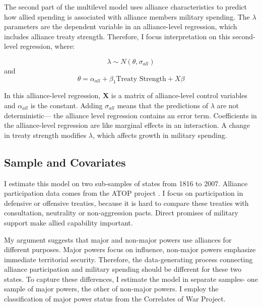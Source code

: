 \documentclass[12pt]{article}
\begin{document}
The second part of the multilevel model uses alliance characteristics to predict how allied spending is associated with alliance members military spending. 
The $\lambda$ parameters are the dependent variable in an alliance-level regression, which includes alliance treaty strength.
Therefore, I focus interpretation on this second-level regression, where: 

\begin{equation}
\lambda \sim N(\theta, \sigma_{all})
\end{equation} 
and 
\begin{equation}
\theta = \alpha_{all} + \beta_1 \mbox{Treaty Strength} + X \beta
\end{equation}

In this alliance-level regression, $\textbf{X}$ is a matrix of alliance-level control variables and $\alpha_{all}$ is the constant.
Adding $\sigma_{all}$ means that the predictions of $\lambda$ are not deterministic--- the alliance level regression contains an error term. 
Coefficients in the alliance-level regression are like marginal effects in an interaction. 
A change in treaty strength modifies $\lambda$, which affects growth in military spending. 


\subsection{Sample and Covariates} 

I estimate this model on two sub-samples of states from 1816 to 2007. 
Alliance participation data comes from the ATOP project \citep{Leedsetal2002}. 
I focus on participation in defensive or offensive treaties, because it is hard to compare these treaties with consultation, neutrality or non-aggression pacts. 
Direct promises of military support make allied capability important. 

My argument suggests that major and non-major powers use alliances for different purposes.
Major powers focus on influence, non-major powers emphasize immediate territorial security.  
Therefore, the data-generating process connecting alliance participation and military spending should be different for these two states. 
To capture these differences, I estimate the model in separate samples- one sample of major powers, the other of non-major powers.
I employ the classification of major power status from the Correlates of War Project. 
\end{document}

